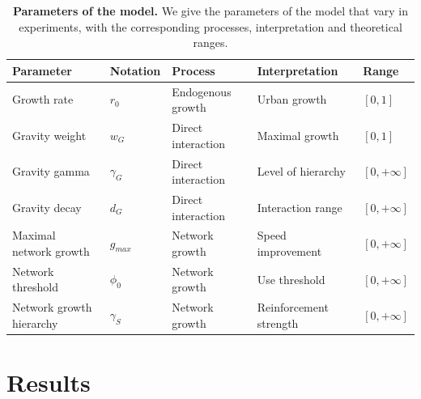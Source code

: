 \documentclass[11pt]{article}
\begin{document}
\begin{table}
\caption{\textbf{Parameters of the model.} We give the parameters of the model that vary in experiments, with the corresponding processes, interpretation and theoretical ranges.\label{tab:parameters}}	
\begin{tabular}{|l|l|l|l|l|}
\hline
Parameter & Notation & Process & Interpretation & Range\\
\hline
Growth rate & $r_0$ & Endogenous growth & Urban growth & $\left[ 0,1\right]$ \\
Gravity weight & $w_G$ & Direct interaction & Maximal growth & $\left[ 0,1\right]$ \\
Gravity gamma & $\gamma_G$ & Direct interaction & Level of hierarchy & $\left[ 0,+\infty\right]$ \\
Gravity decay & $d_G$ & Direct interaction & Interaction range & $\left[ 0,+\infty\right]$ \\
Maximal network growth & $g_{max}$ & Network growth & Speed improvement & $\left[ 0,+\infty\right]$ \\
Network threshold & $\phi_0$ & Network growth & Use threshold & $\left[ 0,+\infty\right]$ \\
Network growth hierarchy & $\gamma_S$ & Network growth & Reinforcement strength & $\left[ 0,+\infty\right]$ \\
\hline
\end{tabular}
\end{table}



\section{Results}



\end{document}
